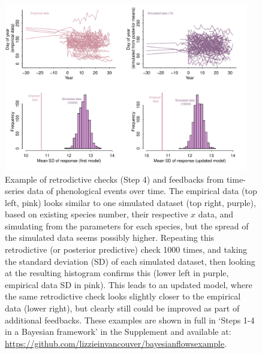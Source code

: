 \documentclass[11pt]{article}
\begin{document}
\begin{figure}[ht]
\centering
\noindent \includegraphics[width=0.95\textwidth]{examples/synchrony/graphs/fourpanelforpaper.pdf} %
\caption{Example of retrodictive checks (Step 4) and feedbacks from time-series data of phenological events over time. The empirical data (top left, pink) looks similar to one simulated dataset (top right, purple), based on existing species number, their respective $x$ data, and simulating from the parameters for each species, but the spread of the simulated data seems possibly higher. Repeating this retrodictive (or posterior predictive) check 1000 times, and taking the standard deviation (SD) of each simulated dataset, then looking at the resulting histogram confirms this (lower left in purple, empirical data SD in pink). This leads to an updated model, where the same retrodictive check looks slightly closer to the empirical data (lower right), but clearly still could be improved as part of additional feedbacks. These examples are shown in full in `Steps 1-4 in a Bayesian framework' in the Supplement and available at: \url{https://github.com/lizzieinvancouver/bayesianflowsexample}.}
\label{fig:retrodictivecheck}
\end{figure}
\end{document}
